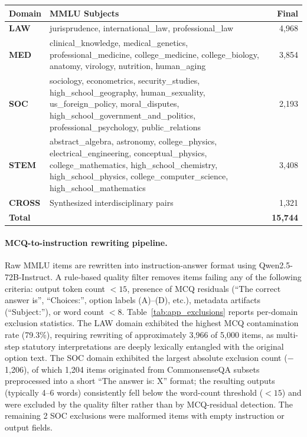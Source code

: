 \documentclass[a4paper,fleql]{cas-sc}
\begin{document}
\vspace{6pt}
\begin{center}
\begingroup
{}
\label{tab:app_data}
\small
\renewcommand{\arraystretch}{1.4}
\begin{tabular}{l >{\raggedright\arraybackslash}p{9cm} r}
\toprule
\textbf{Domain} & \textbf{MMLU Subjects} & \textbf{Final} \\
\midrule
\textbf{LAW}
  & jurisprudence, international\_law, professional\_law & 4,968 \\
\midrule
\textbf{MED}
  & clinical\_knowledge, medical\_genetics, professional\_medicine,
    college\_medicine, college\_biology, anatomy, virology, nutrition,
    human\_aging & 3,854 \\
\midrule
\textbf{SOC}
  & sociology, econometrics, security\_studies,
    high\_school\_geography, human\_sexuality, us\_foreign\_policy,
    moral\_disputes, high\_school\_government\_and\_politics,
    professional\_psychology, public\_relations & 2,193 \\
\midrule
\textbf{STEM}
  & abstract\_algebra, astronomy, college\_physics,
    electrical\_engineering, conceptual\_physics, college\_mathematics,
    high\_school\_chemistry, high\_school\_physics,
    college\_computer\_science, high\_school\_mathematics & 3,408 \\
\midrule
\textbf{CROSS} & Synthesized interdisciplinary pairs & 1,321 \\
\midrule
\textbf{Total} & & \textbf{15,744} \\
\bottomrule
\end{tabular}
\endgroup
\end{center}
\vspace{6pt}

\paragraph{MCQ-to-instruction rewriting pipeline.}
Raw MMLU items are rewritten into instruction-answer format using
Qwen2.5-72B-Instruct. A rule-based quality filter removes items failing
any of the following criteria: output token count $< 15$, presence of MCQ
residuals (``The correct answer is'', ``Choices:'', option labels
(A)--(D), etc.), metadata artifacts (``Subject:''), or word count $< 8$.
Table~\ref{tab:app_exclusions} reports per-domain exclusion statistics.
The LAW domain exhibited the highest MCQ contamination rate (79.3\%),
requiring rewriting of approximately 3,966 of 5,000 items, as multi-step
statutory interpretations are deeply lexically entangled with the original
option text. The SOC domain exhibited the largest absolute exclusion count
($-$1,206), of which 1,204 items originated from CommonsenseQA subsets
preprocessed into a short ``The answer is: X'' format; the resulting
outputs (typically 4--6 words) consistently fell below the word-count
threshold ($< 15$) and were excluded by the quality filter rather than by
MCQ-residual detection. The remaining 2 SOC exclusions were malformed items
with empty instruction or output fields.
\end{document}
